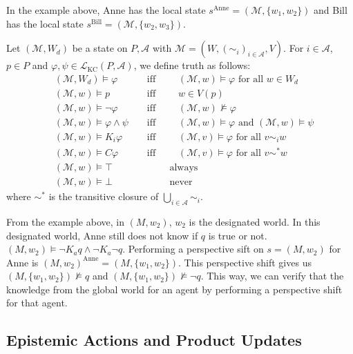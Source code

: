 In the example above, Anne has the local state $s^{\text{Anne}}=(\mathcal{M},\{w_1,w_2\})$ and Bill has the local state $s^{\text{Bill}}=(\mathcal{M},\{w_2,w_3\})$.


Let $(\mathcal{M}, W_d)$ be a state on $P,\mathcal{A}$ with $\mathcal{M}=(W, (\sim_i)_{i \in \mathcal{A}}, V)$. For $i \in \mathcal{A}$, $p \in P$ and $\varphi, \psi \in \mathcal{L}_{\text{KC}}(P,\mathcal{A})$, we define truth as follows:
\begin{align*}
  &(\mathcal{M}, W_d) \models \varphi
    & &\text{ iff } \qquad
    (\mathcal{M},w)\models \varphi \text{ for all } w \in W_d \\
  &(\mathcal{M}, w) \models p
    & &\text{ iff } \qquad
    w \in V(p) \\
  &(\mathcal{M}, w) \models \neg \varphi
    & &\text{ iff } \qquad
    (\mathcal{M},w) \not\models \varphi \\
  &(\mathcal{M}, w) \models \varphi \wedge \psi
    & &\text{ iff } \qquad
    (\mathcal{M},w) \models \varphi \text{ and } (\mathcal{M},w) \models \psi \\
  &(\mathcal{M}, w) \models K_i \varphi
    & &\text{ iff } \qquad
    (\mathcal{M},v) \models \varphi \text{ for all } v \sim_i w \\
  &(\mathcal{M}, w) \models C \varphi
    & &\text{ iff } \qquad
    (\mathcal{M},v) \models \varphi \text{ for all } v \sim^* w \\
  &(\mathcal{M}, w) \models \top
    & &\text{        } \qquad
    \text{always} \\
  &(\mathcal{M}, w) \models \bot
    & &\text{        } \qquad
    \text{never}
\end{align*}
where $\sim^*$ is the transitive closure of $\bigcup_{i \in \mathcal{A}}\sim_i$.


From the example above, in $(M,w_2)$, $w_2$ is the designated world. In this designated world, Anne still does not know if $q$ is true or not. $(M,w_2) \models \neg K_aq \wedge \neg K_a \neg q$.
Performing a perspective sift on $s=(M,w_2)$ for Anne is $(M,w_2)^{\text{Anne}} =(M,\{w_1,w_2\})$. This perspective shift gives us $(M,\{w_1,w_2\})\not\models q$ and $(M,\{w_1,w_2\})\not\models \neg q$. This way, we can verify that the knowledge from the global world for an agent by performing a perspective shift for that agent.


\subsection{Epistemic Actions and Product Updates}

